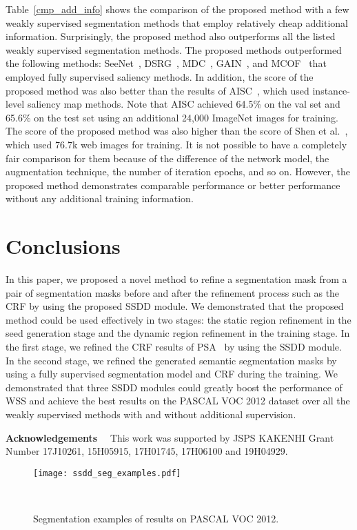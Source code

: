 \documentclass[10pt,twocolumn,letterpaper]{article}
\begin{document}
Table~\ref{cmp_add_info} shows the comparison of the proposed method with 
a few weakly supervised segmentation methods that employ relatively cheap additional information.
Surprisingly, the proposed method also outperforms all the listed weakly supervised segmentation methods.
The proposed methods outperformed the following methods:
SeeNet~\cite{bfb}, DSRG~\cite{stc}, MDC~\cite{sec}, GAIN~\cite{gain}, and MCOF~\cite{mcof} that
employed fully supervised saliency methods.
In addition, the score of the proposed method was also better than the results of AISC~\cite{salins},
which used instance-level saliency map methods.
Note that AISC achieved 64.5\% on the val set and 65.6\% on the test set using an additional 24,000 ImageNet images for training.
The score of the proposed method was also higher than the score of Shen et al.~\cite{cvpr18web}, which used 76.7k web images for training.
It is not possible to have a completely fair comparison for them because of the difference of the network model, the augmentation technique, the number of iteration epochs, and so on.
However, the proposed method demonstrates comparable performance or better performance without any additional training information.

\section{Conclusions}
In this paper, we proposed a novel method to refine a segmentation mask from a pair of segmentation masks before and after the refinement process such as the CRF by using the proposed SSDD module.
We demonstrated that the proposed method could be used effectively in two stages: the static region refinement in the seed generation stage and the dynamic region refinement in the training stage.
In the first stage, we refined the CRF results of PSA~\cite{psa} by using the SSDD module.
In the second stage, we refined the generated semantic segmentation masks by using a fully supervised segmentation model and CRF during the training.
We demonstrated that three SSDD modules could greatly boost the performance of WSS and achieve the best results on the PASCAL VOC 2012 dataset over all the weakly supervised 
methods with and without additional supervision.

\medskip
\noindent 
{\bf Acknowledgements}~~
This work was supported by JSPS KAKENHI Grant
Number 17J10261, 15H05915, 17H01745, 17H06100 and 19H04929.

\begin{figure}[tbh]
\begin{center}
\texttt{[image: ssdd\_seg\_examples.pdf]}
\caption{Segmentation examples of results on PASCAL VOC 2012.} \label{exseg2}
\end{center}
\vskip -10mm~
\end{figure}
\end{document}
